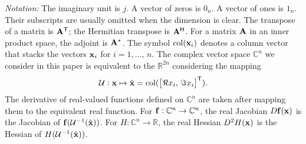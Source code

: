 

{\it Notation:}
The imaginary unit is $j$. %
A vector of zeros is $0_n$. A vector of ones is $1_n$. Their subscripts are usually omitted when the dimension is clear. 
The transpose of a matrix is $\mathbf{A}^{\mathsf{T}}$; the Hermitian transpose is $\mathbf{A}^{\mathsf{H}}$. For a matrix $\mathbf{A}$ in an inner product space, the adjoint is $\mathbf{A}^*$. %
The symbol $\operatorname*{col}(\mathbf{x}_i)$ denotes a column vector that stacks the vectors $\mathbf{x}_i$ for $i = 1,\ldots,\, n$. 
The complex vector space $\mathbb{C}^n$ we consider in this paper is equivalent to the $\mathbb{R}^{2n}$ considering the mapping 
\begin{equation*}
    \mathcal U: \mathbf{x} \mapsto \hat{\mathbf{x}} = \operatorname*{col}(\big[\Re x_i,\, \Im x_i \big]^{\mathsf{T}}). 
\end{equation*}
The derivative of real-valued functions defined on $\mathbb{C}^n$ are taken after mapping them to the equivalent real function. For $\mathbf{f}: \mathbb{C}^n \to \mathbb{C}^n$, the real Jacobian $D \mathbf{f}(\mathbf{x})$ is the Jacobian of $\mathbf{f}(\mathcal U^{-1}(\hat{\mathbf{x}}))$. For $H: \mathbb{C}^n \to \mathbb{R}$, the real Hessian $D^2 H(\mathbf{x})$ is the Hessian of $H(\mathcal U^{-1}(\hat{\mathbf{x}}))$. 
